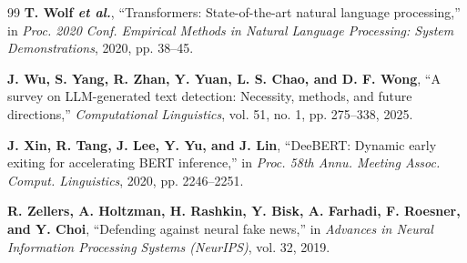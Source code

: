 \begin{thebibliography}{99}
\textbf{T. Wolf \textit{et al.}}, ``Transformers: State-of-the-art natural language processing,'' in \textit{Proc. 2020 Conf. Empirical Methods in Natural Language Processing: System Demonstrations}, 2020, pp. 38--45.

\textbf{J. Wu, S. Yang, R. Zhan, Y. Yuan, L. S. Chao, and D. F. Wong}, ``A survey on LLM-generated text detection: Necessity, methods, and future directions,'' \textit{Computational Linguistics}, vol. 51, no. 1, pp. 275--338, 2025.

\textbf{J. Xin, R. Tang, J. Lee, Y. Yu, and J. Lin}, ``DeeBERT: Dynamic early exiting for accelerating BERT inference,'' in \textit{Proc. 58th Annu. Meeting Assoc. Comput. Linguistics}, 2020, pp. 2246--2251.

\textbf{R. Zellers, A. Holtzman, H. Rashkin, Y. Bisk, A. Farhadi, F. Roesner, and Y. Choi}, ``Defending against neural fake news,'' in \textit{Advances in Neural Information Processing Systems (NeurIPS)}, vol. 32, 2019.

\end{thebibliography}
\endgroup
